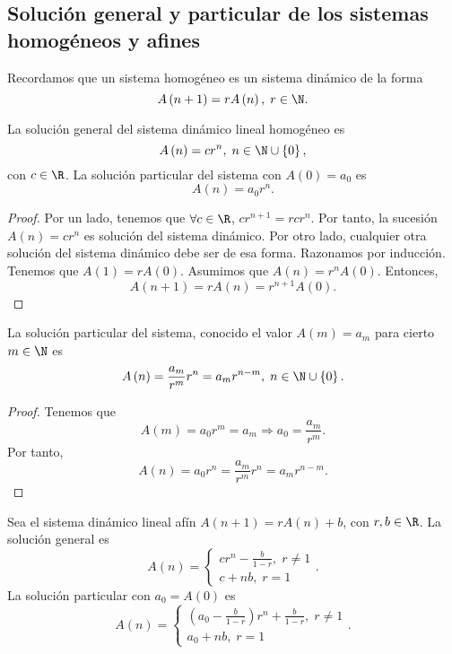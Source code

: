 \subsection{Solución general y particular de los sistemas homogéneos y afines}
Recordamos que un sistema homogéneo es un sistema dinámico de la forma
\[A\left(n + 1\right) = rA\left(n\right), \; r \in \N .\]
\begin{ftheorem}[]
\normalfont La solución general del sistema dinámico lineal homogéneo es
\[ A\left(n\right) = cr^{n}, \; n \in \N \cup \left\{ 0\right\}  ,\]
con $\displaystyle c \in \R $. La solución particular del sistema con $\displaystyle A\left(0\right) = a_{0} $ es 
\[A\left(n\right) = a_{0}r^{n} .\]
\end{ftheorem}
\begin{proof}
Por un lado, tenemos que $\displaystyle \forall c \in \R $, $\displaystyle cr^{n+1} =rcr^{n} $. Por tanto, la sucesión $\displaystyle A\left(n\right) = cr^{n} $ es solución del sistema dinámico. Por otro lado, cualquier otra solución del sistema dinámico debe ser de esa forma. Razonamos por inducción. Tenemos que $\displaystyle A\left(1\right) = rA\left(0\right) $. Asumimos que $\displaystyle A\left(n\right) = r^{n}A\left(0\right) $. Entonces,
\[A\left(n+1\right) = rA\left(n\right) = r^{n+1}A\left(0\right) .\]
\end{proof}
\begin{fcolorary}[]
\normalfont La solución particular del sistema, conocido el valor $\displaystyle A\left(m\right) = a_{m} $ para cierto $\displaystyle m \in \N $ es 
\[A\left(n\right) = \frac{a_{m}}{r^{m}}r^{n} = a_{m}r^{n-m}, \; n \in \N \cup \left\{ 0\right\}  .\]
\end{fcolorary}
\begin{proof}
Tenemos que 
\[A\left(m\right) = a_{0}r^{m} = a_{m} \Rightarrow a_{0} = \frac{a_{m}}{r^{m}} .\]
Por tanto,
\[A\left(n\right) = a_{0}r^{n} = \frac{a_{m}}{r^{m}}r^{n} = a_{m}r^{n - m} .\]
\end{proof}
\begin{ftheorem}[]
\normalfont Sea el sistema dinámico lineal afín $\displaystyle A\left(n+1\right) = rA\left(n\right) + b $, con $\displaystyle r,b \in \R $. La solución general es
\[A\left(n\right) = 
\begin{cases}
cr^{n} - \frac{b}{1-r}, \; r \neq 1\\
c + nb, \; r = 1
\end{cases}
.\]
La solución particular con $\displaystyle a_{0} = A\left(0\right) $ es
\[A\left(n\right) =
\begin{cases}
	\left(a_{0}-\frac{b}{1-r}\right)r^{n}+\frac{b}{1-r}, \; r \neq 1 \\
	a_{0} + nb, \; r = 1
\end{cases}
.\]
\end{ftheorem}
